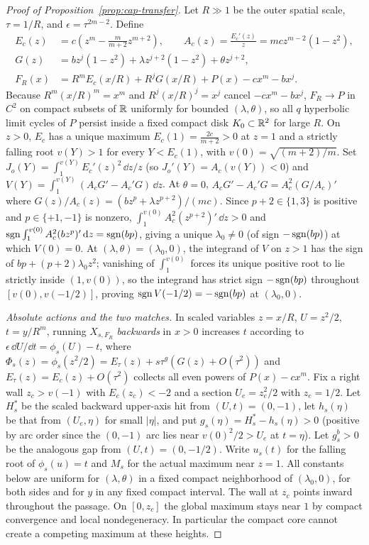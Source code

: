\begin{proof}[Proof of Proposition~\ref{prop:cap-transfer}]
Let $R\gg 1$ be the outer spatial scale, $\tau=1/R$, and $\epsilon=\tau^{2m-2}$. Define
\begin{align}
  E_c(z) &= c\!\left(z^m - \frac{m}{m+2}z^{m+2}\right),\qquad A_c(z)=\frac{E_c'(z)}{z}=mc z^{m-2}(1-z^2),\nonumber\\
  G(z)   &= b z^j(1-z^2) + \lambda z^{j+2}(1-z^2) + \theta z^{j+2},\nonumber\\
  F_R(x) &= R^m E_c(x/R) + R^j G(x/R) + P(x) - cx^m - bx^j.\label{eq:cap-poly}
\end{align}
Because $R^m(x/R)^m=x^m$ and $R^j(x/R)^j=x^j$ cancel $-cx^m-bx^j$, $F_R\to P$ in $C^2$ on compact subsets of $\mathbb{R}$ uniformly for bounded $(\lambda,\theta)$, so all $q$ hyperbolic limit cycles of $P$ persist inside a fixed compact disk $K_0\subset\mathbb{R}^2$ for large $R$. On $z>0$, $E_c$ has a unique maximum $E_c(1)=\frac{2c}{m+2}>0$ at $z=1$ and a strictly falling root $v(Y)>1$ for every $Y<E_c(1)$, with $v(0)=\sqrt{(m+2)/m}$. Set $J_o(Y)=\int_1^{v(Y)}E_c'(z)^2\,\dd z/z$ (so $J_o'(Y)=A_c(v(Y))<0$) and $V(Y)=\int_1^{v(Y)}(A_c G'-A_c' G)\,\dd z$. At $\theta=0$, $A_c G'-A_c' G=A_c^2(G/A_c)'$ where $G(z)/A_c(z)=(b z^p + \lambda z^{p+2})/(mc)$. Since $p+2\in\{1,3\}$ is positive and $p\in\{+1,-1\}$ is nonzero, $\int_1^{v(0)}A_c^2(z^{p+2})'\,\dd z>0$ and $\operatorname{sgn}\int_1^{v(0)}A_c^2(bz^p)'\,\mathrm{d} z=\operatorname{sgn}(bp)$, giving a unique $\lambda_0\neq 0$ (of sign $-\operatorname{sgn}(bp)$) at which $V(0)=0$. At $(\lambda,\theta)=(\lambda_0,0)$, the integrand of $V$ on $z>1$ has the sign of $bp+(p+2)\lambda_0 z^2$; vanishing of $\int_1^{v(0)}$ forces its unique positive root to lie strictly inside $(1,v(0))$, so the integrand has strict sign $-\operatorname{sgn}(bp)$ throughout $[v(0),v(-1/2)]$, proving $\operatorname{sgn} V(-1/2)=-\operatorname{sgn}(bp)$ at $(\lambda_0,0)$.

\emph{Absolute actions and the two matches.} In scaled variables $z=x/R$, $U=z^2/2$, $t=y/R^m$, running $X_{s,F_R}$ \emph{backwards} in $x>0$ increases $t$ according to $\epsilon\,\dd U/\dd t=\phi_s(U)-t$, where $\Phi_s(z)=\phi_s(z^2/2)=E_\tau(z)+s\tau^g(G(z)+O(\tau^2))$ and $E_\tau(z)=E_c(z)+O(\tau^2)$ collects all even powers of $P(x)-cx^m$. Fix a right wall $z_c>v(-1)$ with $E_c(z_c)<-2$ and a section $U_e=z_e^2/2$ with $z_e=1/2$. Let $H_s^*$ be the scaled backward upper-axis hit from $(U,t)=(0,-1)$, let $h_s(\eta)$ be that from $(U_e,\eta)$ for small $|\eta|$, and put $g_s(\eta)=H_s^*-h_s(\eta)>0$ (positive by arc order since the $(0,-1)$ arc lies near $v(0)^2/2>U_e$ at $t=\eta$). Let $g_s^b>0$ be the analogous gap from $(U,t)=(0,-1/2)$. 
Write $u_s(t)$ for the falling root of $\phi_s(u)=t$ and $M_s$ for
the actual maximum near $z=1$. All constants below are uniform for
$(\lambda,\theta)$ in a fixed compact neighborhood of $(\lambda_0,0)$,
for both sides and for $y$ in any fixed compact interval. The wall
at $z_c$ points inward throughout the passage. On $[0,z_c]$ the
global maximum stays near $1$ by compact convergence and local
nondegeneracy. In particular the compact core cannot create a competing
maximum at these heights.


\end{proof}
